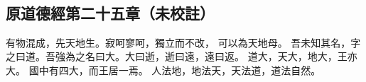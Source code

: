 ﻿%
%

\chapter{~}

\section{原道德經第二十五章（未校註）}

\begin{withgezhu}

\zhsong


\textcolor{tongjia-color}{有物混成，先天地生。寂呵寥呵，獨立而不改}，
可以為天地母。
\textcolor{tongjia-color}{吾未知其名，字之曰道。吾強為之名曰大。大曰逝，逝曰遠，遠曰返}。
道大，天大，地大，\textcolor{tongjia-color}{王亦大}。
\textcolor{tongjia-color}{國中}有四大，\textcolor{tongjia-color}{而王居一焉}。
人法地，地法天，天法道，道法自然。

\end{withgezhu}

